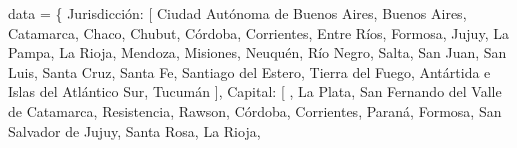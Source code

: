 \documentclass[
  letterpaper,
  DIV=11,
  numbers=noendperiod]{scrreprt}
\newenvironment{Shaded}{\begin{snugshade}}{\end{snugshade}}
\newcommand{\NormalTok}[1]{\textcolor[rgb]{0.00,0.23,0.31}{#1}}
\newcommand{\OperatorTok}[1]{\textcolor[rgb]{0.37,0.37,0.37}{#1}}
\newcommand{\StringTok}[1]{\textcolor[rgb]{0.13,0.47,0.30}{#1}}
\begin{document}
\begin{enumerate}
\begin{Shaded}
\begin{Highlighting}[]
\NormalTok{data }\OperatorTok{=}\NormalTok{ \{}
    \StringTok{\textquotesingle{}Jurisdicción\textquotesingle{}}\NormalTok{: [}
        \StringTok{\textquotesingle{}Ciudad Autónoma de Buenos Aires\textquotesingle{}}\NormalTok{, }\StringTok{\textquotesingle{}Buenos Aires\textquotesingle{}}\NormalTok{, }\StringTok{\textquotesingle{}Catamarca\textquotesingle{}}\NormalTok{, }\StringTok{\textquotesingle{}Chaco\textquotesingle{}}\NormalTok{, }\StringTok{\textquotesingle{}Chubut\textquotesingle{}}\NormalTok{,}
        \StringTok{\textquotesingle{}Córdoba\textquotesingle{}}\NormalTok{, }\StringTok{\textquotesingle{}Corrientes\textquotesingle{}}\NormalTok{, }\StringTok{\textquotesingle{}Entre Ríos\textquotesingle{}}\NormalTok{, }\StringTok{\textquotesingle{}Formosa\textquotesingle{}}\NormalTok{, }\StringTok{\textquotesingle{}Jujuy\textquotesingle{}}\NormalTok{, }\StringTok{\textquotesingle{}La Pampa\textquotesingle{}}\NormalTok{, }\StringTok{\textquotesingle{}La Rioja\textquotesingle{}}\NormalTok{,}
        \StringTok{\textquotesingle{}Mendoza\textquotesingle{}}\NormalTok{, }\StringTok{\textquotesingle{}Misiones\textquotesingle{}}\NormalTok{, }\StringTok{\textquotesingle{}Neuquén\textquotesingle{}}\NormalTok{, }\StringTok{\textquotesingle{}Río Negro\textquotesingle{}}\NormalTok{, }\StringTok{\textquotesingle{}Salta\textquotesingle{}}\NormalTok{, }\StringTok{\textquotesingle{}San Juan\textquotesingle{}}\NormalTok{, }\StringTok{\textquotesingle{}San Luis\textquotesingle{}}\NormalTok{,}
        \StringTok{\textquotesingle{}Santa Cruz\textquotesingle{}}\NormalTok{, }\StringTok{\textquotesingle{}Santa Fe\textquotesingle{}}\NormalTok{, }\StringTok{\textquotesingle{}Santiago del Estero\textquotesingle{}}\NormalTok{, }\StringTok{\textquotesingle{}Tierra del Fuego, Antártida e Islas del Atlántico Sur\textquotesingle{}}\NormalTok{,}
        \StringTok{\textquotesingle{}Tucumán\textquotesingle{}}
\NormalTok{    ],}
    \StringTok{\textquotesingle{}Capital\textquotesingle{}}\NormalTok{: [}
        \StringTok{\textquotesingle{}\textquotesingle{}}\NormalTok{, }\StringTok{\textquotesingle{}La Plata\textquotesingle{}}\NormalTok{, }\StringTok{\textquotesingle{}San Fernando del Valle de Catamarca\textquotesingle{}}\NormalTok{, }\StringTok{\textquotesingle{}Resistencia\textquotesingle{}}\NormalTok{, }\StringTok{\textquotesingle{}Rawson\textquotesingle{}}\NormalTok{,}
        \StringTok{\textquotesingle{}Córdoba\textquotesingle{}}\NormalTok{, }\StringTok{\textquotesingle{}Corrientes\textquotesingle{}}\NormalTok{, }\StringTok{\textquotesingle{}Paraná\textquotesingle{}}\NormalTok{, }\StringTok{\textquotesingle{}Formosa\textquotesingle{}}\NormalTok{, }\StringTok{\textquotesingle{}San Salvador de Jujuy\textquotesingle{}}\NormalTok{, }\StringTok{\textquotesingle{}Santa Rosa\textquotesingle{}}\NormalTok{, }\StringTok{\textquotesingle{}La Rioja\textquotesingle{}}\NormalTok{,}

\end{Highlighting}
\end{Shaded}
\end{enumerate}
\end{document}
